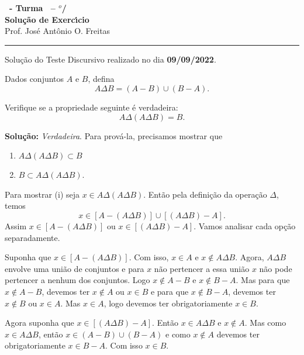 \documentclass[12pt]{exam}
\begin{document}
    \begin{center}
        {\Large\bf \disciplina\ - Turma \turma\ -- \semestre$^{o}$/\ano} \\ \vspace{9pt} {\large\bf
        Solu\c{c}\~ao de Exerc{\'\i}cio}\\
        \vspace{9pt} Prof. Jos{\'e} Ant{\^o}nio O. Freitas
    \end{center}
    \hrule

    \vspace{.6cm}

    Solu\c{c}\~ao do Teste Discursivo realizado no dia \textbf{09/09/2022}.

    \vspace{.6cm}

    \questao{} Dados conjuntos $A$ e $B$, defina
    \[
        A \Delta B = (A - B) \cup (B - A).
    \]

    Verifique se a propriedade seguinte \'e verdadeira:
    \[
        A \Delta (A \Delta B) = B.
    \]


    \noindent\textbf{Solu\c{c}\~ao:} \textit{Verdadeira}. Para prov\'a-la, precisamos mostrar que
    \begin{enumerate}[label=({\roman*})]
        \item $A \Delta (A \Delta B) \subset B$
        \item $B \subset A \Delta (A \Delta B)$.
    \end{enumerate}

    Para mostrar (i)  seja $x \in A \Delta (A \Delta B)$. Ent\~ao pela defini\c{c}\~ao da opera\c{c}\~ao $\Delta$, temos
    \[
        x \in [A - (A \Delta B)] \cup [(A \Delta B) - A].
    \]
    Assim $x \in [A - (A \Delta B)]$ ou $x \in [(A \Delta B) - A]$. Vamos analisar cada op\c{c}\~ao separadamente.

    Suponha que $x \in [A - (A \Delta B)]$. Com isso, $x \in A$ e $x \notin A \Delta B$. Agora, $A \Delta B$ envolve uma uni\~ao de conjuntos e para $x$ n\~ao pertencer a essa uni\~ao $x$ n\~ao pode pertencer a nenhum dos conjuntos. Logo $x \notin A - B$ e $x \notin B - A$. Mas para que $x \notin A - B$, devemos ter $x \notin A$ ou $x \in B$ e para que $x \notin B - A$, devemos ter $x \notin B$ ou $x \in A$. Mas $x \in A$, logo devemos ter obrigatoriamente $x \in B$.

    Agora suponha que $x \in [(A \Delta B) - A]$. Ent\~ao $x \in A \Delta B$ e $x \notin A$. Mas como $x \in A \Delta B$, ent\~ao $x \in (A - B) \cup (B - A)$ e como $x \notin A$ devemos ter obrigatoriamente $x \in B - A$. Com isso $x \in B$.
\end{document}
